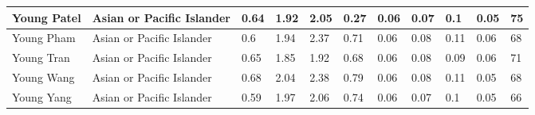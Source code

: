\begin{table}[!ht]
\begin{tabular}{|l|l|l|l|l|l|l|l|l|l|l|}
        Young Patel & Asian or Pacific Islander & 0.64 & 1.92 & 2.05 & 0.27 & 0.06 & 0.07 & 0.1 & 0.05 & 75 \\ \hline
        Young Pham & Asian or Pacific Islander & 0.6 & 1.94 & 2.37 & 0.71 & 0.06 & 0.08 & 0.11 & 0.06 & 68 \\ \hline
        Young Tran & Asian or Pacific Islander & 0.65 & 1.85 & 1.92 & 0.68 & 0.06 & 0.08 & 0.09 & 0.06 & 71 \\ \hline
        Young Wang & Asian or Pacific Islander & 0.68 & 2.04 & 2.38 & 0.79 & 0.06 & 0.08 & 0.11 & 0.05 & 68 \\ \hline
        Young Yang & Asian or Pacific Islander & 0.59 & 1.97 & 2.06 & 0.74 & 0.06 & 0.07 & 0.1 & 0.05 & 66 \\ \hline
    \end{tabular}
\end{table}